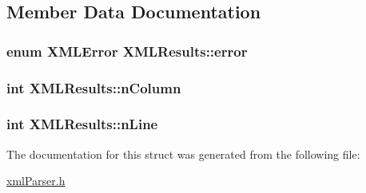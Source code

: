 \subsection{Member Data Documentation}
\hypertarget{structXMLResults_adb341083266eabf9fe45587b838c0962}{
\subsubsection[{error}]{\setlength{\rightskip}{0pt plus 5cm}enum {\bf X\-M\-L\-Error} X\-M\-L\-Results\-::error}}\label{structXMLResults_adb341083266eabf9fe45587b838c0962}
\hypertarget{structXMLResults_af0d1358dbb7b124d2e8e4d9052509c8e}{
\subsubsection[{n\-Column}]{\setlength{\rightskip}{0pt plus 5cm}int X\-M\-L\-Results\-::n\-Column}}\label{structXMLResults_af0d1358dbb7b124d2e8e4d9052509c8e}
\hypertarget{structXMLResults_a8741d887c2843fc1ce8fffc12f662595}{
\subsubsection[{n\-Line}]{\setlength{\rightskip}{0pt plus 5cm}int X\-M\-L\-Results\-::n\-Line}}\label{structXMLResults_a8741d887c2843fc1ce8fffc12f662595}


The documentation for this struct was generated from the following file\-:\begin{DoxyCompactItemize}
\item 
\hyperlink{xmlParser_8h}{xml\-Parser.\-h}\end{DoxyCompactItemize}
